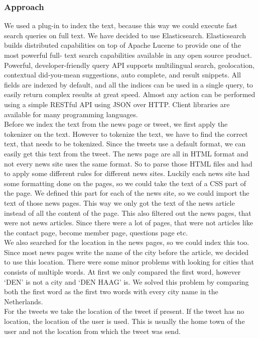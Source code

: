 \subsubsection*{Approach}
We used a plug-in to index the text, because this way we could execute fast search queries on full text. 
We have decided to use Elasticsearch. 
Elasticsearch builds distributed capabilities on top of Apache Lucene to provide one of the most powerful full- text search capabilities available in any open source product. 
Powerful, developer-friendly query API supports multilingual search, geolocation, contextual did-you-mean suggestions, auto complete, and result snippets.
All fields are indexed by default, and all the indices can be used in a single query, to easily return complex results at great speed.  
Almost any action can be performed using a simple RESTful API using JSON over HTTP. Client libraries are available for many programming languages.\\
Before we index the text from the news page or tweet, we first apply the tokenizer on the text.
However to tokenize the text, we have to find the correct text, that needs to be tokenized.
Since the tweets use a default format, we can easily get this text from the tweet. 
The news page are all in HTML format and not every news site uses the same format. 
So to parse those HTML files and had to apply some different rules for different news sites.
Luckily each news site had some formatting done on the pages, so we could take the text of a CSS part of the page. 
We defined this part for each of the news site, so we could import the text of those news pages.  
This way we only got the text of the news article instead of all the content of the page.
This also filtered out the news pages, that were not news articles. 
Since there were a lot of pages, that were not articles like the contact page, become member page, questions page etc.  \\
We also searched for the location in the news pages, so we could index this too. 
Since most news pages write the name of the city before the article, we decided to use this location.
There were some minor problems with looking for cities that consists of multiple words. 
At first we only compared the first word, however `DEN' is not a city and `DEN HAAG' is. 
We solved this problem by comparing both the first word as the first two words with every city name in the Netherlands. \\
 For the tweets we take the location of the tweet if present. 
If the tweet has no location, the location of the user is used. 
This is usually the home town of the user and not the location from which the tweet was send.\\ 


